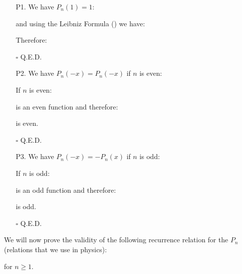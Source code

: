 	\begin{enumerate}
		\item[P1.] We have $P_n(1)=1$:
		\begin{dem}
		
		and using the Leibniz Formula () we have:
		
		Therefore:
		
		\begin{flushright}
			$\square$  Q.E.D.
		\end{flushright}
		\end{dem}

		\item[P2.] We have $P_n(-x)=P_n(-x)$ if $n$ is even:
		\begin{dem}
		If $n$ is even:
		
		is an even function and therefore:
		
		is even.
		\begin{flushright}
			$\square$  Q.E.D.
		\end{flushright}
		\end{dem}

		\item[P3.] We have $P_n(-x)=-P_n(x)$ if $n$ is odd:
		\begin{dem}
		If $n$ is odd:
		
		is an odd function and therefore:
		
		is odd.
		\begin{flushright}
			$\square$  Q.E.D.
		\end{flushright}
		\end{dem}
	\end{enumerate}
	\begin{theorem}
	We will now prove the validity of the following recurrence relation for the $P_n$ (relations that we use in physics):
	
	for $n \geq 1$.
	\end{theorem}
